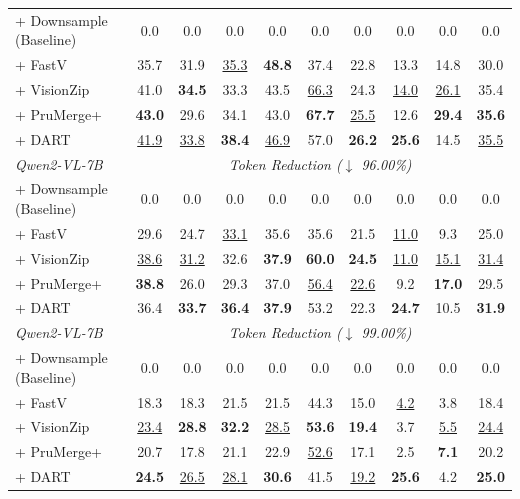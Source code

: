 \begin{table}[!h]
{\begin{tabular}{l|c c c c c c c c |c}
+ Downsample (Baseline) & 0.0 & 0.0 & 0.0 & 0.0 & 0.0 & 0.0 & 0.0 & 0.0 & 0.0 \\
\rowcolor{gray!10}+ FastV~\cite{chen2024image} & 35.7 & 31.9 & \underline{35.3} & \textbf{48.8} & 37.4 & 22.8 & 13.3 & 14.8 & 30.0 \\
 + VisionZip~\cite{yang2025visionzip}  & 41.0 & \textbf{34.5} & 33.3 & 43.5 & \underline{66.3} & 24.3 & \underline{14.0} & \underline{26.1} & 35.4 \\
\rowcolor{gray!10}+ PruMerge+~\cite{shang2024llava} & \textbf{43.0} & 29.6 & 34.1 & 43.0 & \textbf{67.7} & \underline{25.5} & 12.6 & \textbf{29.4} & \textbf{35.6} \\
 + DART~\cite{wen2025stop}& \underline{41.9} & \underline{33.8} & \textbf{38.4} & \underline{46.9} & 57.0 & \textbf{26.2} & \textbf{25.6} & 14.5 & \underline{35.5} \\
\midrule
\rowcolor{lightgrayblue} \textit{Qwen2-VL-7B~\cite{wang2024qwen2}} & \multicolumn{9}{c}{\textit{Token Reduction ($\downarrow$ 96.00\%)}} \\ \midrule

+ Downsample (Baseline) & 0.0 & 0.0 & 0.0 & 0.0 & 0.0 & 0.0 & 0.0 & 0.0 & 0.0 \\
\rowcolor{gray!10}+ FastV~\cite{chen2024image} & 29.6 & 24.7 & \underline{33.1} & 35.6 & 35.6 & 21.5 & \underline{11.0} & 9.3 & 25.0 \\
 + VisionZip~\cite{yang2025visionzip} & \underline{38.6} & \underline{31.2} & 32.6 & \textbf{37.9} & \textbf{60.0} & \textbf{24.5} & \underline{11.0} & \underline{15.1} & \underline{31.4} \\
\rowcolor{gray!10}+ PruMerge+~\cite{shang2024llava} & \textbf{38.8} & 26.0 & 29.3 & 37.0 & \underline{56.4} & \underline{22.6} & 9.2 & \textbf{17.0} & 29.5 \\
 + DART~\cite{wen2025stop}& 36.4 & \textbf{33.7} & \textbf{36.4} & \textbf{37.9} & 53.2 & 22.3 & \textbf{24.7} & 10.5 & \textbf{31.9} \\
\midrule
\rowcolor{lightgrayblue} \textit{Qwen2-VL-7B~\cite{wang2024qwen2}} & \multicolumn{9}{c}{\textit{Token Reduction ($\downarrow$ 99.00\%)}} \\ \midrule
+ Downsample (Baseline) & 0.0 & 0.0 & 0.0 & 0.0 & 0.0 & 0.0 & 0.0 & 0.0 & 0.0 \\
\rowcolor{gray!10} + FastV~\cite{chen2024image} & 18.3 & 18.3 & 21.5 & 21.5 & 44.3 & 15.0 & \underline{4.2} & 3.8 & 18.4 \\
+ VisionZip~\cite{yang2025visionzip} & \underline{23.4} & \textbf{28.8} & \textbf{32.2} & \underline{28.5} & \textbf{53.6} & \textbf{19.4} & 3.7 & \underline{5.5} & \underline{24.4} \\
\rowcolor{gray!10} + PruMerge+~\cite{shang2024llava} & 20.7 & 17.8 & 21.1 & 22.9 & \underline{52.6} & 17.1 & 2.5 & \textbf{7.1} & 20.2 \\
+ DART~\cite{wen2025stop} & \textbf{24.5} & \underline{26.5} & \underline{28.1} & \textbf{30.6} & 41.5 & \underline{19.2} & \textbf{25.6} & 4.2 & \textbf{25.0} \\
\bottomrule
\end{tabular}}
\end{table}
